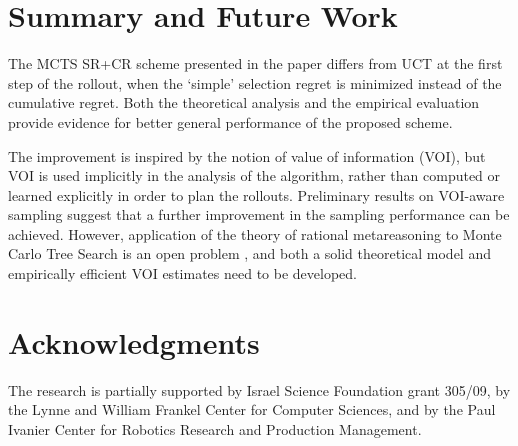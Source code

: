 \documentclass[letterpaper]{article}
\begin{document}
\section{Summary and Future Work}
\label{sec:summary}

The MCTS SR+CR scheme presented in the paper differs
from UCT at the first step of the rollout, when the `simple' selection
regret is minimized instead of the cumulative regret. Both the
theoretical analysis and the empirical evaluation provide evidence for
better general performance of the proposed scheme.

The improvement is inspired by the notion of value of information
(VOI), but VOI is used implicitly in the analysis of the algorithm,
rather than computed or learned explicitly in order to plan the
rollouts. Preliminary results on VOI-aware sampling suggest that a
further improvement in the sampling performance can be
achieved. However, application of the theory of rational metareasoning
to Monte Carlo Tree Search is an open problem \cite{HayRussell.MCTS},
and both a solid theoretical model and empirically efficient VOI
estimates need to be developed.

\section*{Acknowledgments}

The research is partially supported by Israel
Science Foundation grant 305/09, by the Lynne and William Frankel
Center for Computer Sciences, and by the Paul Ivanier Center for
Robotics Research and Production Management.



\end{document}
